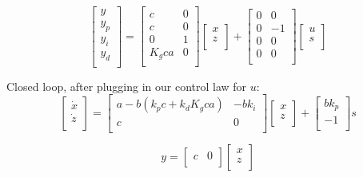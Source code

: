\documentclass[10pt,letterpaper]{article}
\begin{document}
\begin{equation} \label{eq:complete_output}
\begin{bmatrix}
	y \\
	y_p \\
	y_i \\
	y_d \\
\end{bmatrix} =
\begin{bmatrix}
	c & 0 \\
	c & 0 \\
	0 & 1 \\
	K_g c a & 0 \\
\end{bmatrix}
\begin{bmatrix}
	x \\
	z \\
\end{bmatrix} + 
\begin{bmatrix}
	0 & 0 \\
	0 & -1 \\
	0 & 0 \\
	0 & 0 \\
\end{bmatrix}
\begin{bmatrix}
	u \\
	s \\
\end{bmatrix}
\end{equation}

Closed loop, after plugging in our control law for $u$:
\begin{equation} \label{eq:final_state}
\begin{bmatrix}
    \dot{x} \\
    \dot{z} \\
\end{bmatrix} =
\begin{bmatrix}
	a - b (k_p c + k_d K_g c a) & -b k_i \\
	c & 0 \\
\end{bmatrix}
\begin{bmatrix}
	x \\
	z \\
\end{bmatrix} + 
\begin{bmatrix}
	b k_p \\
	-1 \\
\end{bmatrix} s
\end{equation}

\begin{equation} \label{eq:final_output}
y = \begin{bmatrix}
	c & 0 \\
\end{bmatrix}
\begin{bmatrix}
	x \\
	z \\
\end{bmatrix}
\end{equation}
\end{document}
